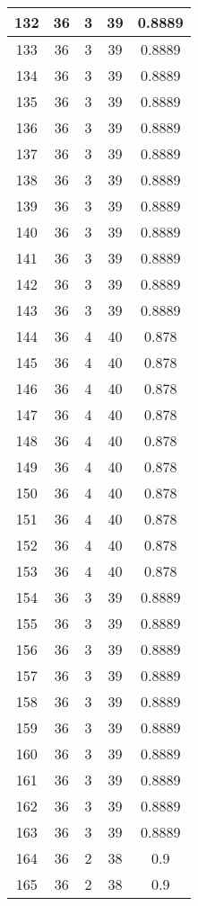 \documentclass[letterpaper, 12pt]{article}
\begin{document}
\begin{longtable}{|c|c|c|c|c|}
\hline
132 & 36 & 3 & 39 & 0.8889 \\
\hline
133 & 36 & 3 & 39 & 0.8889 \\
\hline
134 & 36 & 3 & 39 & 0.8889 \\
\hline
135 & 36 & 3 & 39 & 0.8889 \\
\hline
136 & 36 & 3 & 39 & 0.8889 \\
\hline
137 & 36 & 3 & 39 & 0.8889 \\
\hline
138 & 36 & 3 & 39 & 0.8889 \\
\hline
139 & 36 & 3 & 39 & 0.8889 \\
\hline
140 & 36 & 3 & 39 & 0.8889 \\
\hline
141 & 36 & 3 & 39 & 0.8889 \\
\hline
142 & 36 & 3 & 39 & 0.8889 \\
\hline
143 & 36 & 3 & 39 & 0.8889 \\
\hline
144 & 36 & 4 & 40 & 0.878 \\
\hline
145 & 36 & 4 & 40 & 0.878 \\
\hline
146 & 36 & 4 & 40 & 0.878 \\
\hline
147 & 36 & 4 & 40 & 0.878 \\
\hline
148 & 36 & 4 & 40 & 0.878 \\
\hline
149 & 36 & 4 & 40 & 0.878 \\
\hline
150 & 36 & 4 & 40 & 0.878 \\
\hline
151 & 36 & 4 & 40 & 0.878 \\
\hline
152 & 36 & 4 & 40 & 0.878 \\
\hline
153 & 36 & 4 & 40 & 0.878 \\
\hline
154 & 36 & 3 & 39 & 0.8889 \\
\hline
155 & 36 & 3 & 39 & 0.8889 \\
\hline
156 & 36 & 3 & 39 & 0.8889 \\
\hline
157 & 36 & 3 & 39 & 0.8889 \\
\hline
158 & 36 & 3 & 39 & 0.8889 \\
\hline
159 & 36 & 3 & 39 & 0.8889 \\
\hline
160 & 36 & 3 & 39 & 0.8889 \\
\hline
161 & 36 & 3 & 39 & 0.8889 \\
\hline
162 & 36 & 3 & 39 & 0.8889 \\
\hline
163 & 36 & 3 & 39 & 0.8889 \\
\hline
164 & 36 & 2 & 38 & 0.9 \\
\hline
165 & 36 & 2 & 38 & 0.9 \\

\end{longtable}
\end{document}
